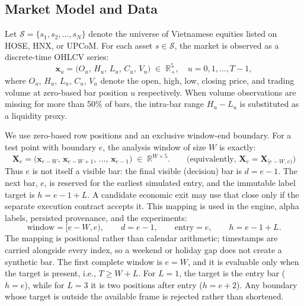 \subsection{Market Model and Data}

Let $\mathcal{S} = \{s_1, s_2, \ldots, s_N\}$ denote the universe of
Vietnamese equities listed on HOSE, HNX, or UPCoM.
For each asset $s \in \mathcal{S}$, the market is observed as a
discrete-time OHLCV series:
\begin{equation}
    \mathbf{x}_u = \bigl(O_u,\, H_u,\, L_u,\, C_u,\, V_u\bigr)
    \;\in\; \mathbb{R}^5_{+},
    \quad u = 0, 1, \ldots, T-1,
\end{equation}
where $O_u$, $H_u$, $L_u$, $C_u$, $V_u$ denote the open, high, low,
closing price, and trading volume at zero-based bar position $u$ respectively.
When volume observations are missing for more than 50\% of bars, the
intra-bar range $H_u - L_u$ is substituted as a liquidity proxy.

We use zero-based row positions and an exclusive window-end boundary.  For a
test point with boundary $e$, the analysis window of size $W$ is exactly:
\begin{equation}
    \mathbf{X}_{e} = \bigl(\mathbf{x}_{e-W},\,
                           \mathbf{x}_{e-W+1},\, \ldots,\,
                           \mathbf{x}_{e-1}\bigr)
    \;\in\; \mathbb{R}^{W \times 5}.
    \qquad\text{(equivalently, }\mathbf{X}_{e}=\mathbf{X}_{[e-W,e)}\text{)}
\end{equation}
Thus $e$ is not itself a visible bar: the final visible (decision) bar is
$d=e-1$.  The next bar, $e$, is reserved for the earliest simulated entry,
and the immutable label target is $h=e-1+L$.  A candidate economic exit may
use that close only if the separate execution contract accepts it. This mapping is used in the
engine, alpha labels, persisted provenance, and the experiments:
\begin{equation}
    \boxed{\quad
    \text{window}=[e-W,e),\qquad d=e-1,\qquad
    \text{entry}=e,\qquad h=e-1+L.\quad}
    \label{eq:time_index_contract}
\end{equation}
The mapping is positional rather than calendar arithmetic; timestamps are
carried alongside every index, so a weekend or holiday gap does not create a
synthetic bar.  The first complete window is $e=W$, and it is evaluable only
when the target is present, i.e., $T\geq W+L$.  For $L=1$, the target is the
entry bar ($h=e$), while for $L=3$ it is two positions after entry
($h=e+2$).  Any boundary whose target is outside the available frame is
rejected rather than shortened.

